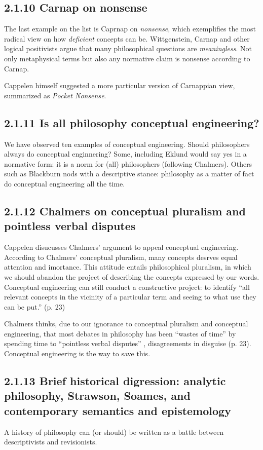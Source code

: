 \documentclass[
10pt, %
a4paper, %
twocolumn, %
landscape %
]{article}
\begin{document}
\subsection*{2.1.10 Carnap on nonsense}
The last example on the list is Caprnap on \emph{nonsense}, which exemplifies the most radical view on how \emph{deficient} concepts can be. Wittgenstein, Carnap and other logical positivists argue that many philosophical questions are \emph{meaningless}. Not only metaphysical terms but also any normative claim is nonsense according to Carnap.

Cappelen himself suggested a more particular version of  Carnappian view, summarized as \emph{Pocket Nonsense}.

\subsection*{2.1.11 Is all philosophy conceptual engineering?}
We have observed ten examples of conceptual engineering. Should philosophers always do conceptual enginnering?
Some, including Eklund would say yes in a normative form: it is a norm for (all) philosophers (following Chalmers).
Others such as Blackburn nods with a descriptive stance: philosophy as a matter of fact do conceptual engineering all the time.

\subsection*{2.1.12 Chalmers on conceptual pluralism and pointless verbal disputes}
Cappelen disucusses Chalmers' argument to appeal conceptual engineering.
According to Chalmers' conceptual pluralism, many concepts desrves equal attention and imortance. This attitude entails philosophical pluralism, in which we should abandon the project of describing the concepts expressed by our words.
Conceptual engineering can still conduct a constructive project: to identify ``all relevant concepts in the vicinity of a particular term and seeing to what use they can be put.'' (p. 23)

Chalmers thinks, due to our ignorance to conceptual pluralism and conceptual engineering, that most debates in philosophy has been ``wastes of time'' by spending time to ``pointless verbal disputes'' , disagreements in disguise (p. 23).
Conceptual engineering is the way to save this.

\subsection*{2.1.13 Brief historical digression: analytic philosophy, Strawson, Soames, and contemporary semantics and epistemology}
A history of philosophy can (or should) be written as a battle between descriptivists and revisionists.
\end{document}
